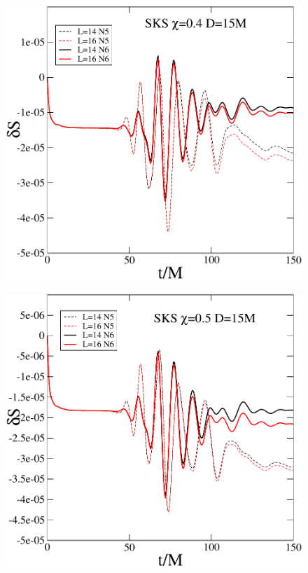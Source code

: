 \begin{figure}
  \includegraphics[width=0.95\columnwidth]{chap5/dS_SKS_S4}
\end{figure}

\begin{figure}
  \includegraphics[width=0.95\columnwidth]{chap5/dS_SKS_S5}
\end{figure}

